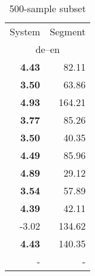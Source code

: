 \begin{table}[ht]
\begin{subtable}{0.19\linewidth}
{\begin{tabular}{rr}
\toprule
System & Segment \\
\multicolumn{2}{c}{de--en} \\
\midrule
\textbf{4.43}   &  {82.11}  \\
\textbf{3.50}   &  {63.86}  \\
\textbf{4.93}   &  {164.21}  \\
\midrule
\textbf{3.77}   &  {85.26}  \\
\textbf{3.50}   &  {40.35}  \\
\midrule
\textbf{4.49}   &  {85.96}  \\
\textbf{4.89}   &  {29.12}  \\
\midrule
\textbf{3.54}   &  {57.89}  \\
\textbf{4.39}   &  {42.11}  \\
\midrule
-3.02 & 134.62 \\
\midrule
\textbf{4.43}   &  {140.35}  \\
 - & - \\
\bottomrule
\end{tabular}}
\caption{\label{tab:correl-500-subset}500-sample subset}
\end{subtable}
\end{table}

